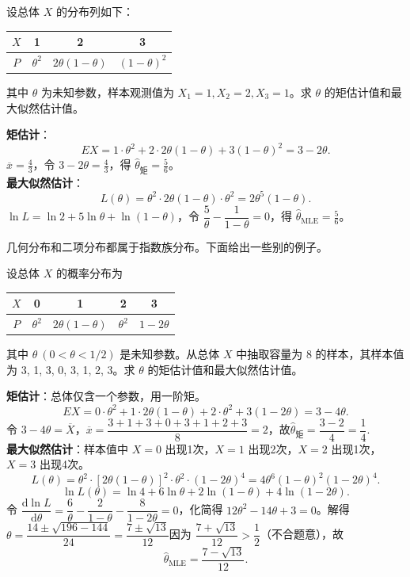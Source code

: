 \documentclass[lang=cn,11pt]{elegantbook}
\begin{document}
\begin{exercise}\label{exer:7-discrete-123}
设总体 \(X\) 的分布列如下：
\begin{center}
\begin{tabular}{c|ccc}
\(X\) & 1 & 2 & 3 \\
\hline
\(P\) & \(\theta^2\) & \(2\theta(1-\theta)\) & \((1-\theta)^2\)
\end{tabular}
\end{center}
其中 \(\theta\) 为未知参数，样本观测值为 \(X_1=1, X_2=2, X_3=1\)。求 \(\theta\) 的矩估计值和最大似然估计值。
\end{exercise}
\begin{solution}
\textbf{矩估计}：
\[
EX = 1\cdot\theta^2 + 2\cdot2\theta(1-\theta) + 3(1-\theta)^2 = 3-2\theta.
\]
\(\overline{x} = \frac{4}{3}\)，令 \(3-2\theta = \frac{4}{3}\)，得 \(\hat{\theta}_{\text{矩}} = \frac56\)。\\
\textbf{最大似然估计}：
\[
L(\theta) = \theta^2 \cdot 2\theta(1-\theta) \cdot \theta^2 = 2\theta^5(1-\theta).
\]
\(\ln L = \ln 2 + 5\ln\theta + \ln(1-\theta)\)，令 \(\dfrac{5}{\theta} - \dfrac{1}{1-\theta} = 0\)，得 \(\hat{\theta}_{\text{MLE}} = \frac56\)。
\end{solution}

\begin{note}
    几何分布和二项分布都属于指数族分布。下面给出一些别的例子。
\end{note}

\begin{exercise}\label{exer:7-discrete-4val}
设总体 \(X\) 的概率分布为
\begin{center}
\begin{tabular}{c|cccc}
\(X\) & 0 & 1 & 2 & 3 \\
\hline
\(P\) & \(\theta^2\) & \(2\theta(1-\theta)\) & \(\theta^2\) & \(1-2\theta\)
\end{tabular}
\end{center}
其中 \(\theta\ (0 < \theta < 1/2)\) 是未知参数。从总体 \(X\) 中抽取容量为 8 的样本，其样本值为 3, 1, 3, 0, 3, 1, 2, 3。求 \(\theta\) 的矩估计值和最大似然估计值。
\end{exercise}
\begin{solution}
\textbf{矩估计}：总体仅含一个参数，用一阶矩。
\[
EX = 0\cdot\theta^2 + 1\cdot2\theta(1-\theta) + 2\cdot\theta^2 + 3(1-2\theta) = 3-4\theta.
\]
令 \(3-4\theta = \overline{X}\)，\(\overline{x} = \dfrac{3+1+3+0+3+1+2+3}{8} = 2\)，故$\hat{\theta}_{\text{矩}} = \dfrac{3-2}{4} = \dfrac{1}{4}$.\\
\textbf{最大似然估计}：样本值中 \(X=0\) 出现1次，\(X=1\) 出现2次，\(X=2\) 出现1次，\(X=3\) 出现4次。
\[
L(\theta) = \theta^2\cdot[2\theta(1-\theta)]^2\cdot\theta^2\cdot(1-2\theta)^4 = 4\theta^6(1-\theta)^2(1-2\theta)^4.
\]
\[
\ln L(\theta) = \ln 4 + 6\ln\theta + 2\ln(1-\theta) + 4\ln(1-2\theta).
\]
令 \(\dfrac{\mathrm{d}\ln L}{\mathrm{d}\theta} = \dfrac{6}{\theta} - \dfrac{2}{1-\theta} - \dfrac{8}{1-2\theta} = 0\)，化简得 \(12\theta^2 - 14\theta + 3 = 0\)。解得$\theta = \dfrac{14\pm\sqrt{196-144}}{24} = \dfrac{7\pm\sqrt{13}}{12}$因为 \(\dfrac{7+\sqrt{13}}{12} > \dfrac{1}{2}\)（不合题意），故
\[
\hat{\theta}_{\text{MLE}} = \frac{7-\sqrt{13}}{12}.
\]
\end{solution}
\end{document}
